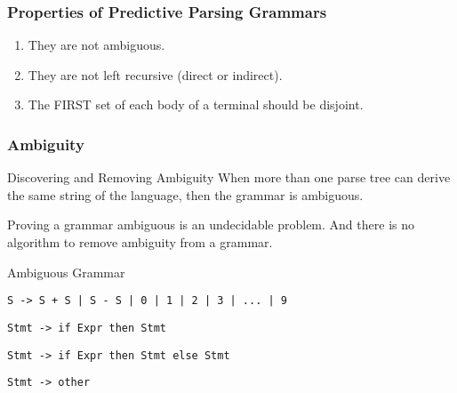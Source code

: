 \begin{frame}
\frametitle{Properties of Predictive Parsing Grammars}

\begin{enumerate}
\item They are not ambiguous.
\item They are not left recursive (direct or indirect).
\item The FIRST set of each body of a terminal should be disjoint.
\end{enumerate}

\end{frame}


\begin{frame}
\frametitle{Ambiguity}

\begin{block}{Discovering and Removing Ambiguity}
When more than one parse tree can derive the same string of the language, then the grammar is ambiguous.

Proving a grammar ambiguous is an undecidable problem. And there is no algorithm to remove ambiguity from a grammar.

\end{block}

\begin{example}{Ambiguous Grammar}

\texttt{S -> S + S | S - S | 0 | 1 | 2 | 3 | ... | 9}

\vspace{1em}

\texttt{Stmt -> if Expr then Stmt}

\texttt{Stmt -> if Expr then Stmt else Stmt}

\texttt{Stmt -> other}

\end{example}

\end{frame}


